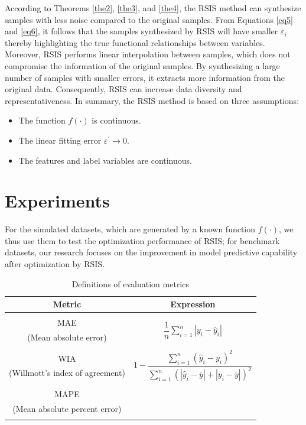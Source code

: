 \documentclass[final,3p,times]{elsarticle}
\begin{document}
{\color{myred}According to Theorems \ref{the2}, \ref{the3}, and \ref{the4}, the RSIS method can synthesize samples with less noise compared to the original samples. From Equations \eqref{eq5} and \eqref{eq6}, it follows that the samples synthesized by RSIS will have smaller $\varepsilon_i$ thereby highlighting the true functional relationships between variables. Moreover, RSIS performs linear interpolation between samples, which does not compromise the information of the original samples. By synthesizing a large number of samples with smaller errors, it extracts more information from the original data. Consequently, RSIS can increase data diversity and representativeness.}
In summary, the RSIS method is based on three assumptions:


\begin{itemize}
  \item The function $f(\cdot)$ is continuous.
  \item The linear fitting error $\varepsilon^\prime\rightarrow0$.
  \item The features and label variables are continuous.
\end{itemize}



\section{Experiments}
For the simulated datasets, which are generated by a known 
function $f(\cdot)$, we thus use them to test the optimization 
performance of RSIS; for benchmark datasets, our research focuses 
on the improvement in model predictive capability after 
optimization by RSIS.

\begin{table}[b!]
  \centering
  \begin{threeparttable}
  \caption{Definitions of evaluation metrics \label{tab1}}
  \begin{tabular}{cc}
  \toprule
  Metric & Expression \\
  \midrule
   & \multirow{4}{*}{$\dfrac{1}{n} \sum_{i=1}^{n} \left| y_i - \hat{y}_i \right|$} \\
  MAE & \\
  (Mean absolute error) & \\
   & \\
   & \multirow{4}{*}{$1 - \dfrac{\sum_{i=1}^{n}(\hat{y}_i - y_i)^2}{\sum_{i=1}^{n}(\left|\hat{y}_i - \bar{y}\right| + \left|y_i - \bar{y}\right|)^2}$} \\
  WIA & \\
  (Willmott's index of agreement) & \\
   & \\ 
   & {\color{myred}\multirow{4}{*}{$\dfrac{1}{n} \sum_{i=1}^{n} \left| \dfrac{y_i - \hat{y}_i}{y_i+0.01} \right|$}} \\
  MAPE & \\
  (Mean absolute percent error) & \\
  & \\
  \bottomrule
  \end{tabular}
\end{threeparttable}
\end{table}
\end{document}
